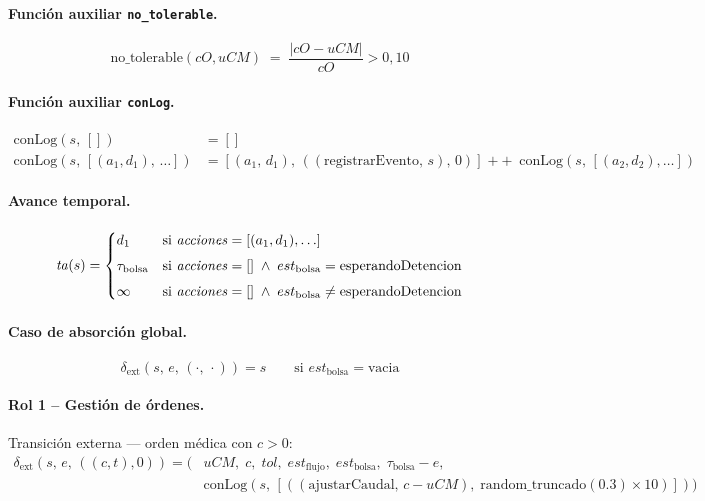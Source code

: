 \paragraph{Función auxiliar \texttt{no\_tolerable}.}
\[
  \mathrm{no\_tolerable}(cO,uCM)
  \;=\;
  \frac{|cO-uCM|}{cO} > 0{,}10
\]

\paragraph{Función auxiliar \texttt{conLog}.}
\begin{align*}
  \mathrm{conLog}(s,\, []) &= [] \\[4pt]
  \mathrm{conLog}(s,\, [(a_1, d_1),\, \ldots]) &=
    [(a_1,\, d_1),\, ((\mathrm{registrarEvento},\, s),\, 0)]
    \;\mathbin{+\!\!+}\;
    \mathrm{conLog}(s,\, [(a_2, d_2), \ldots])
\end{align*}

\paragraph{Avance temporal.}
\[
  \mathit{ta}(s) =
  \begin{cases}
    d_1
      & \text{si } \mathit{acciones} = [(a_1,d_1),\ldots] \\[4pt]
    \tau_{\mathrm{bolsa}}
      & \text{si } \mathit{acciones} = []
        \;\land\; est_{\mathrm{bolsa}} = \mathrm{esperandoDetencion} \\[4pt]
    \infty
      & \text{si } \mathit{acciones} = []
        \;\land\; est_{\mathrm{bolsa}} \neq \mathrm{esperandoDetencion}
  \end{cases}
\]

\paragraph{Caso de absorción global.}
\[
  \delta_{\mathrm{ext}}(s,\,e,\,(\cdot,\,\cdot))
  = s
  \qquad \text{si } est_{\mathrm{bolsa}} = \mathrm{vacia}
\]

\paragraph{Rol 1 – Gestión de órdenes.}
Transición externa — orden médica con $c > 0$:
\begin{align*}
  \delta_{\mathrm{ext}}(s,\,e,\,((c,t),0))
  = \bigl(&uCM,\;c,\;tol,\;est_{\mathrm{flujo}},\;est_{\mathrm{bolsa}},\;
           \tau_{\mathrm{bolsa}}-e, \\
          &\mathrm{conLog}(s,\,[((\mathrm{ajustarCaudal},\, c - uCM),\;
             \mathrm{random\_truncado}(0.3) \times 10)])\bigr)
\end{align*}

